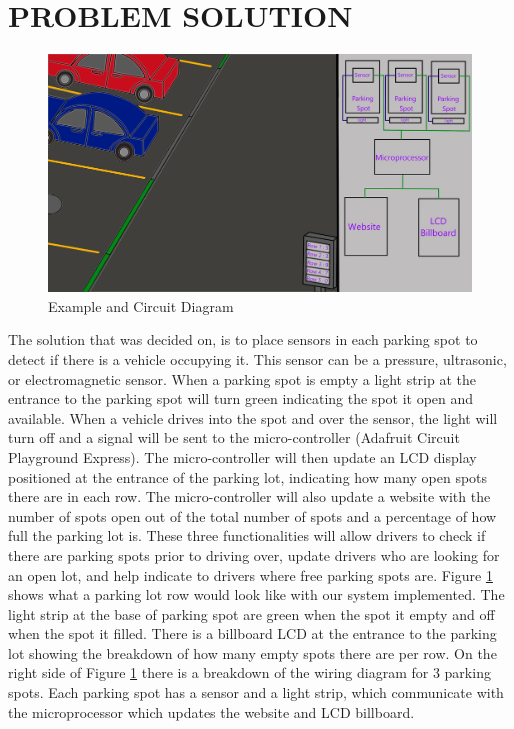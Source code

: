 \documentclass[12pt]{article}
\begin{document}
\section{PROBLEM SOLUTION}
\begin{figure}[!h]
	\centering
	\includegraphics[width=6in]{parkingDiagram.jpg}
	\caption{Example and Circuit Diagram}
	\label{fig:cpx}
\end{figure}
The solution that was decided on, is to place sensors in each parking spot to detect if there is a vehicle occupying it. This sensor can be a pressure, ultrasonic, or electromagnetic sensor. When a parking spot is empty a light strip at the entrance to the parking spot will turn green indicating the spot it open and available. When a vehicle drives into the spot and over the sensor, the light will turn off and a signal will be sent to the micro-controller (Adafruit Circuit Playground Express). The micro-controller will then update an LCD display positioned at the entrance of the parking lot, indicating how many open spots there are in each row. The micro-controller will also update a website with the number of spots open out of the total number of spots and a percentage of how full the parking lot is. These three functionalities will allow drivers to check if there are parking spots prior to driving over, update drivers who are looking for an open lot, and help indicate to drivers where free parking spots are. Figure \ref{fig:cpx} shows what a parking lot row would look like with our system implemented. The light strip at the base of parking spot are green when the spot it empty and off when the spot it filled. There is a billboard LCD at the entrance to the parking lot showing the breakdown of how many empty spots there are per row. On the right side of Figure \ref{fig:cpx} there is a breakdown of the wiring diagram for 3 parking spots. Each parking spot has a sensor and a light strip, which communicate with the microprocessor which updates the website and LCD billboard. 
\end{document}
